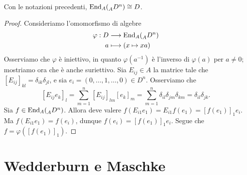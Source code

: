 \begin{proposition}
Con le notazioni precedenti, $\operatorname{End}_A(\prescript{}{A}{D}^n)\cong D$.
\end{proposition}
\begin{proof}
Consideriamo l'omomorfismo di algebre
\begin{align*}
\varphi:D&\longrightarrow\operatorname{End}_A(\prescript{}{A}{D}^n)\\
a&\longmapsto(x\mapsto xa)
\end{align*}
Osserviamo che $\varphi$ è iniettivo, in quanto $\varphi(a^{-1})$ è l'inverso di $\varphi(a)$ per $a\neq 0$; mostriamo ora che è anche suriettivo. Sia $E_{ij}\in A$ la matrice tale che $[E_{ij}]_{kl}=\delta_{ik}\delta_{jl}$, e sia $e_i=(0,\ldots,1,\ldots,0)\in D^n$. Osserviamo che
$$
[E_{ij}e_k]_l=\sum_{m=1}^{n}[E_{ij}]_{lm}[e_k]_m=\sum_{m=1}^{n}\delta_{il}\delta_{jm}\delta_{km}=\delta_{il}\delta_{jk}.
$$
Sia $f\in\operatorname{End}_A(\prescript{}{A}{D}^n)$. Allora deve valere $f(E_{i1}e_1)=E_{i1}f(e_1)=[f(e_1)]_1e_i$. Ma $f(E_{i1}e_1)=f(e_i)$, dunque $f(e_i)=[f(e_1)]_1e_i$. Segue che $f=\varphi([f(e_1)]_1)$.
\end{proof}


\section{Wedderburn e Maschke}



